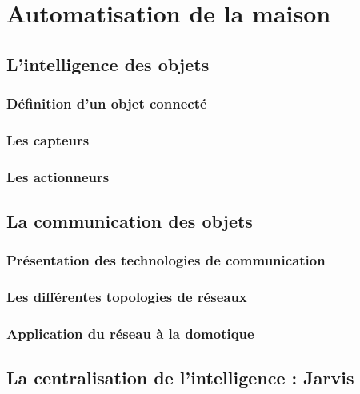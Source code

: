 \chapter{Automatisation de la maison}

\section{L’intelligence des objets}
	\subsection{Définition d’un objet connecté}
	\subsection{Les capteurs}
	\subsection{Les actionneurs}

\section{La communication des objets}
	\subsection{Présentation des technologies de communication}
	\subsection{Les différentes topologies de réseaux}
	\subsection{Application du réseau à la domotique}

\section{La centralisation de l’intelligence : Jarvis}
